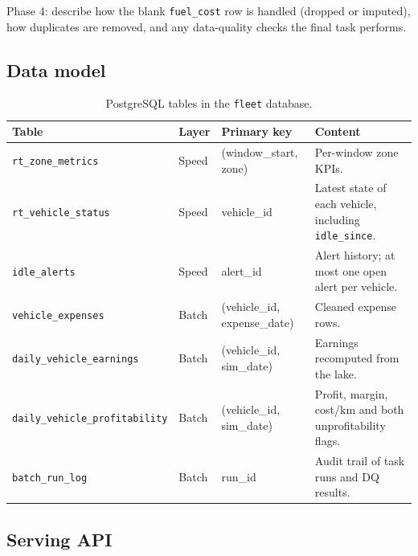 \documentclass[11pt,a4paper]{article}
\newcommand{\code}[1]{\texttt{\small #1}}
\newcommand{\tocomplete}[1]{%
  \begin{tcolorbox}[colback=orange!6,colframe=orange!70!black,
    title=To complete (evidence from the running system),fonttitle=\bfseries\small,
    boxrule=0.6pt,arc=1mm]\small #1\end{tcolorbox}}
\begin{document}
\tocomplete{Phase 4: describe how the blank \code{fuel\_cost} row is handled (dropped or
imputed), how duplicates are removed, and any data-quality checks the final task performs.}

\subsection{Data model}

\begin{table}[H]
\centering\small
\begin{tabularx}{\linewidth}{l l l Y}
\toprule
\textbf{Table} & \textbf{Layer} & \textbf{Primary key} & \textbf{Content} \\
\midrule
\code{rt\_zone\_metrics} & Speed & (window\_start, zone) & Per-window zone KPIs. \\
\code{rt\_vehicle\_status} & Speed & vehicle\_id & Latest state of each vehicle, including
\code{idle\_since}. \\
\code{idle\_alerts} & Speed & alert\_id & Alert history; at most one open alert per vehicle. \\
\code{vehicle\_expenses} & Batch & (vehicle\_id, expense\_date) & Cleaned expense rows. \\
\code{daily\_vehicle\_earnings} & Batch & (vehicle\_id, sim\_date) & Earnings recomputed from the
lake. \\
\code{daily\_vehicle\_profitability} & Batch & (vehicle\_id, sim\_date) & Profit, margin,
cost/km and both unprofitability flags. \\
\code{batch\_run\_log} & Batch & run\_id & Audit trail of task runs and DQ results. \\
\bottomrule
\end{tabularx}
\caption{PostgreSQL tables in the \code{fleet} database.}
\label{tab:model}
\end{table}

\subsection{Serving API}
\end{document}
